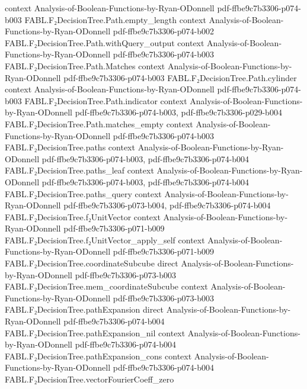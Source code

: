 \begin{theorem}
  {context}
  {Analysis-of-Boolean-Functions-by-Ryan-ODonnell}
  {pdf-ffbe9c7b3306-p074-b003}
\proofstep
  {FABL.F₂DecisionTree.Path.empty_length}
  {context}
  {Analysis-of-Boolean-Functions-by-Ryan-ODonnell}
  {pdf-ffbe9c7b3306-p074-b002}
\proofstep
  {FABL.F₂DecisionTree.Path.withQuery_output}
  {context}
  {Analysis-of-Boolean-Functions-by-Ryan-ODonnell}
  {pdf-ffbe9c7b3306-p074-b003}
\proofstep
  {FABL.F₂DecisionTree.Path.Matches}
  {context}
  {Analysis-of-Boolean-Functions-by-Ryan-ODonnell}
  {pdf-ffbe9c7b3306-p074-b003}
\proofstep
  {FABL.F₂DecisionTree.Path.cylinder}
  {context}
  {Analysis-of-Boolean-Functions-by-Ryan-ODonnell}
  {pdf-ffbe9c7b3306-p074-b003}
\proofstep
  {FABL.F₂DecisionTree.Path.indicator}
  {context}
  {Analysis-of-Boolean-Functions-by-Ryan-ODonnell}
  {pdf-ffbe9c7b3306-p074-b003,
    pdf-ffbe9c7b3306-p029-b004}
\proofstep
  {FABL.F₂DecisionTree.Path.matches_empty}
  {context}
  {Analysis-of-Boolean-Functions-by-Ryan-ODonnell}
  {pdf-ffbe9c7b3306-p074-b003}
\proofstep
  {FABL.F₂DecisionTree.paths}
  {context}
  {Analysis-of-Boolean-Functions-by-Ryan-ODonnell}
  {pdf-ffbe9c7b3306-p074-b003,
    pdf-ffbe9c7b3306-p074-b004}
\proofstep
  {FABL.F₂DecisionTree.paths_leaf}
  {context}
  {Analysis-of-Boolean-Functions-by-Ryan-ODonnell}
  {pdf-ffbe9c7b3306-p074-b003,
    pdf-ffbe9c7b3306-p074-b004}
\proofstep
  {FABL.F₂DecisionTree.paths_query}
  {context}
  {Analysis-of-Boolean-Functions-by-Ryan-ODonnell}
  {pdf-ffbe9c7b3306-p073-b004,
    pdf-ffbe9c7b3306-p074-b004}
\proofstep
  {FABL.F₂DecisionTree.f₂UnitVector}
  {context}
  {Analysis-of-Boolean-Functions-by-Ryan-ODonnell}
  {pdf-ffbe9c7b3306-p071-b009}
\proofstep
  {FABL.F₂DecisionTree.f₂UnitVector_apply_self}
  {context}
  {Analysis-of-Boolean-Functions-by-Ryan-ODonnell}
  {pdf-ffbe9c7b3306-p071-b009}
\proofstep
  {FABL.F₂DecisionTree.coordinateSubcube}
  {direct}
  {Analysis-of-Boolean-Functions-by-Ryan-ODonnell}
  {pdf-ffbe9c7b3306-p073-b003}
\proofstep
  {FABL.F₂DecisionTree.mem_coordinateSubcube}
  {context}
  {Analysis-of-Boolean-Functions-by-Ryan-ODonnell}
  {pdf-ffbe9c7b3306-p073-b003}
\proofstep
  {FABL.F₂DecisionTree.pathExpansion}
  {direct}
  {Analysis-of-Boolean-Functions-by-Ryan-ODonnell}
  {pdf-ffbe9c7b3306-p074-b004}
\proofstep
  {FABL.F₂DecisionTree.pathExpansion_nil}
  {context}
  {Analysis-of-Boolean-Functions-by-Ryan-ODonnell}
  {pdf-ffbe9c7b3306-p074-b004}
\proofstep
  {FABL.F₂DecisionTree.pathExpansion_cons}
  {context}
  {Analysis-of-Boolean-Functions-by-Ryan-ODonnell}
  {pdf-ffbe9c7b3306-p074-b004}
\proofstep
  {FABL.F₂DecisionTree.vectorFourierCoeff_zero}

\end{theorem}
